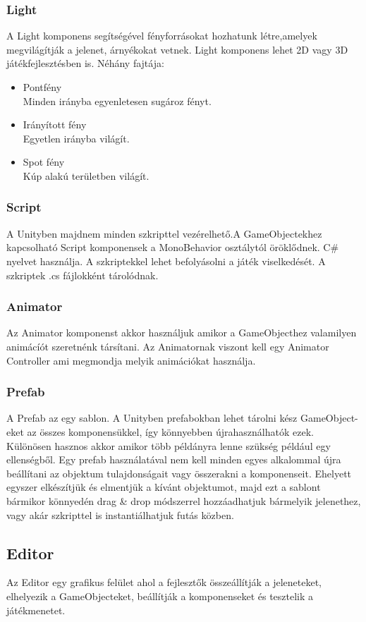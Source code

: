 \documentclass[
]{thesis-ekf}
\theoremstyle{definition}
\theoremstyle{remark}
\begin{document}
\subsubsection{Light}
A Light komponens segítségével fényforrásokat hozhatunk létre,amelyek megvilágítják a jelenet, árnyékokat vetnek. Light komponens lehet 2D vagy 3D játékfejlesztésben is. Néhány fajtája:
\begin{itemize}
	\item Pontfény \\ Minden irányba egyenletesen sugároz fényt.
	\item Irányított fény \\ Egyetlen irányba világít.
	\item Spot fény \\ Kúp alakú területben világít.
\end{itemize}
\subsubsection{Script}
A Unityben majdnem minden szkripttel vezérelhető.A GameObjectekhez kapcsolható Script komponensek a MonoBehavior osztálytól öröklődnek. C\# nyelvet használja. A szkriptekkel lehet befolyásolni a játék viselkedését. A szkriptek .cs fájlokként tárolódnak. 

\subsubsection{Animator}
Az Animator komponenst akkor használjuk amikor a GameObjecthez valamilyen animácíót szeretnénk társítani. Az Animatornak viszont kell egy Animator Controller ami megmondja melyik animációkat használja.

\subsubsection{Prefab}
A Prefab az egy sablon. A Unityben prefabokban lehet tárolni kész GameObject-eket az összes komponensükkel, így könnyebben újrahasználhatók ezek. Különösen hasznos akkor amikor több példányra lenne szükség például egy ellenségből. Egy prefab használatával nem kell minden egyes alkalommal újra beállítani az objektum tulajdonságait vagy összerakni a komponenseit. Ehelyett egyszer elkészítjük és elmentjük a kívánt objektumot, majd ezt a sablont bármikor könnyedén drag \& drop módszerrel hozzáadhatjuk bármelyik jelenethez, vagy akár szkripttel is instantiálhatjuk futás közben.

\subsection{Editor}
Az Editor egy grafikus felület ahol a fejlesztők összeállítják a jeleneteket, elhelyezik a GameObjecteket, beállítják a komponenseket és tesztelik a játékmenetet.
\end{document}
